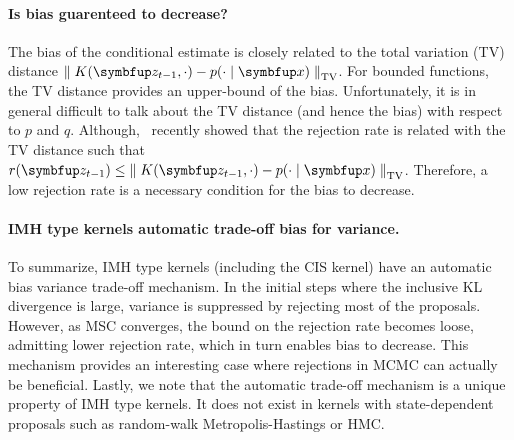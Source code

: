 
\paragraph{Is bias guarenteed to decrease?}
The bias of the conditional estimate is closely related to the total variation (TV) distance \(\DTV{K(\vz_{t-1}, \cdot)}{p(\cdot\mid\vx)}\).
For bounded functions, the TV distance provides an upper-bound of the bias.
Unfortunately, it is in general difficult to talk about the TV distance (and hence the bias) with respect to \(p\) and \(q\).
Although,~\citet{wang_exact_2020} recently showed that the rejection rate is related with the TV distance such that \(r(\vz_{t-1}) \leq \DTV{K(\vz_{t-1}, \cdot)}{p(\cdot\mid\vx)}\).
Therefore, a low rejection rate is a necessary condition for the bias to decrease.

\paragraph{IMH type kernels automatic trade-off bias for variance.}
To summarize, IMH type kernels (including the CIS kernel) have an automatic bias variance trade-off mechanism.
In the initial steps where the inclusive KL divergence is large, variance is suppressed by rejecting most of the proposals.
However, as MSC converges, the bound on the rejection rate becomes loose, admitting lower rejection rate, which in turn enables bias to decrease.
This mechanism provides an interesting case where rejections in MCMC can actually be beneficial.
Lastly, we note that the automatic trade-off mechanism is a unique property of IMH type kernels.
It does not exist in kernels with state-dependent proposals such as random-walk Metropolis-Hastings or HMC.


